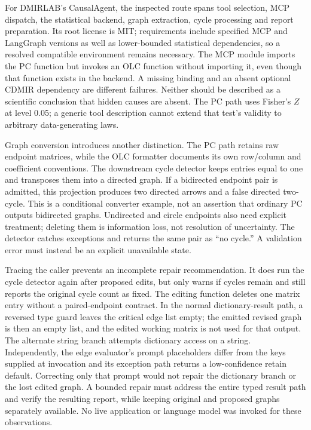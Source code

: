 For DMIRLAB's CausalAgent, the inspected route spans tool selection, MCP
dispatch, the statistical backend, graph extraction, cycle processing and
report preparation. Its root license is MIT; requirements include specified
MCP and LangGraph versions as well as lower-bounded statistical dependencies,
so a resolved compatible environment remains necessary. The MCP module
imports the PC function but invokes an OLC function without importing it,
even though that function exists in the backend. A missing binding and an
absent optional CDMIR dependency are different failures. Neither should be
described as a scientific conclusion that hidden causes are absent. The PC
path uses Fisher's $Z$ at level 0.05; a generic tool description cannot
extend that test's validity to arbitrary data-generating laws.
\citep{exec15_latent_causalagent}

Graph conversion introduces another distinction. The PC path retains raw
endpoint matrices, while the OLC formatter documents its own row/column and
coefficient conventions. The downstream cycle detector keeps entries equal
to one and transposes them into a directed graph. If a bidirected endpoint
pair is admitted, this projection produces two directed arrows and a false
directed two-cycle. This is a conditional converter example, not an assertion
that ordinary PC outputs bidirected graphs. Undirected and circle endpoints
also need explicit treatment; deleting them is information loss, not
resolution of uncertainty. The detector catches exceptions and returns the
same pair as ``no cycle.'' A validation error must instead be an explicit
unavailable state.
\citep{exec15_latent_causalagent,exec15_latent_exact}

Tracing the caller prevents an incomplete repair recommendation. It does
run the cycle detector again after proposed edits, but only warns if cycles
remain and still reports the original cycle count as fixed. The editing
function deletes one matrix entry without a paired-endpoint contract. In
the normal dictionary-result path, a reversed type guard leaves the critical
edge list empty; the emitted revised graph is then an empty list, and the
edited working matrix is not used for that output. The alternate string
branch attempts dictionary access on a string. Independently, the edge
evaluator's prompt placeholders differ from the keys supplied at invocation
and its exception path returns a low-confidence retain default. Correcting
only that prompt would not repair the dictionary branch or the lost edited
graph. A bounded repair must address the entire typed result path and verify
the resulting report, while keeping original and proposed graphs separately
available. No live application or language model was invoked for these
observations.
\citep{exec15_latent_causalagent}

